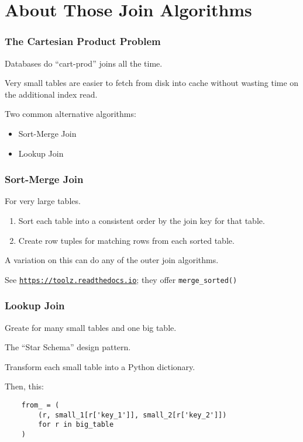 \documentclass{beamer}
\begin{document}
\section{About Those Join Algorithms}
\begin{frame}
    \frametitle{The Cartesian Product Problem}

    Databases do ``cart-prod'' joins all the time.

    \vspace{1em}
    Very small tables are easier to fetch from disk into cache without wasting time on the additional index read.

    \vspace{1em}
    Two common alternative algorithms:
    \begin{itemize}
        \item Sort-Merge Join
        \item Lookup Join
    \end{itemize}
\end{frame}

\begin{frame}
    \frametitle{Sort-Merge Join}

    For very large tables.

    \begin{enumerate}
    \item Sort each table into a consistent order by the join key for that table.

    \item Create row tuples for matching rows from each sorted table.
    \end{enumerate}

    \vspace{1em}

    A variation on this can do any of the outer join algorithms.

    \vspace{1em}

    See \texttt{\underline{https://toolz.readthedocs.io}}; they offer \texttt{merge\_sorted()}

\end{frame}


\begin{frame}[fragile]
    \frametitle{Lookup Join}

    Greate for many small tables and one big table.

    The ``Star Schema'' design pattern.

    \vspace{1em}
    Transform each small table into a Python dictionary.

    Then, this:
    \begin{verbatim}
    from_ = (
        (r, small_1[r['key_1']], small_2[r['key_2']])
        for r in big_table
    )
    \end{verbatim}
\end{frame}
\end{document}
